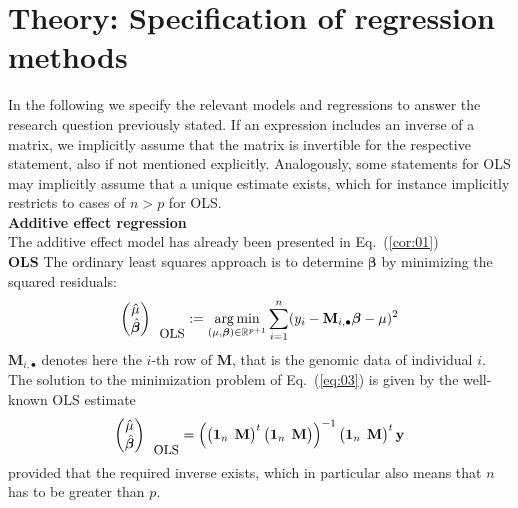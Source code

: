 \documentclass{bmcart}
\DeclareMathOperator*{\argmin}{arg\,min}
\newcommand{\M}{\mathbf{M}}
\newcommand{\0}{\mathbf{0}}
\begin{document}
\section*{Theory: Specification of regression methods}
In the following we specify the relevant models and regressions to answer the research question previously stated. 
If an expression includes an inverse of a matrix, we implicitly assume that the matrix is invertible for the respective statement, also if not mentioned explicitly. 
Analogously, some statements for OLS may implicitly assume that a unique estimate exists, which for instance implicitly restricts to cases of $n>p$ for OLS. \vspace{0.4cm} \\
{\bf Additive effect regression}\vspace{0.2cm}\\ 
The additive effect model has already been presented in Eq.~(\ref{cor:01}) \vspace{0.1cm}\\
{\bf OLS} 
The ordinary least squares approach is to determine $\bm{\beta}$ by minimizing the squared residuals: 
\begin{equation}\label{eq:03}
	\begin{pmatrix}
		\hat{\mu} \\
		\hat{\bm{\beta}}
	\end{pmatrix}_{\mbox{\small OLS}} := \argmin_{(\mu,\bm{\beta}) \in \mathbb{R}^{p+1}} \sum\limits_{i=1}^n (y_i - \M_{i,\bullet}\bm{\beta} - \mu)^2
\end{equation}
$\M_{i,\bullet}$ denotes here the $i$-th row of $\M$, that is the genomic data of individual $i$. The solution to the minimization problem of Eq.~(\ref{eq:03}) is given by the well-known OLS estimate
\begin{equation}\label{eq:04}
	\begin{pmatrix}
		\hat{\mu} \\
		\hat{\bm{\beta}}
	\end{pmatrix}_{\mbox{\small OLS}} =
	\left( 
	\begin{pmatrix}
		\mathbf{1}_n & \hspace{-0.2cm}\M
	\end{pmatrix}^{t}
	\begin{pmatrix}
		\mathbf{1}_n & \hspace{-0.2cm} \M
	\end{pmatrix} \right)^{-1} 
	\begin{pmatrix}
		\mathbf{1}_n & \hspace{-0.2cm} \M
	\end{pmatrix}^{t}
	\mathbf{y}
\end{equation}
provided that the required inverse exists, which in particular also means that $n$ has to be greater than $p$.\\
\end{document}
